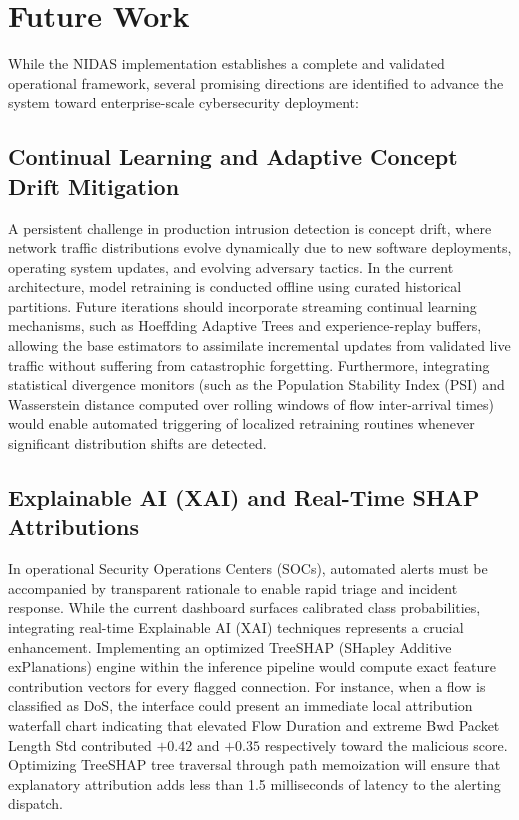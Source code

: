 \documentclass[12pt,a4paper]{report}
\begin{document}

\newpage
\chapter{Future Work}

While the NIDAS implementation establishes a complete and validated operational framework, several promising directions are identified to advance the system toward enterprise-scale cybersecurity deployment:

\section{Continual Learning and Adaptive Concept Drift Mitigation}

A persistent challenge in production intrusion detection is concept drift, where network traffic distributions evolve dynamically due to new software deployments, operating system updates, and evolving adversary tactics. In the current architecture, model retraining is conducted offline using curated historical partitions. Future iterations should incorporate streaming continual learning mechanisms, such as Hoeffding Adaptive Trees and experience-replay buffers, allowing the base estimators to assimilate incremental updates from validated live traffic without suffering from catastrophic forgetting. Furthermore, integrating statistical divergence monitors (such as the Population Stability Index (PSI) and Wasserstein distance computed over rolling windows of flow inter-arrival times) would enable automated triggering of localized retraining routines whenever significant distribution shifts are detected.

\section{Explainable AI (XAI) and Real-Time SHAP Attributions}

In operational Security Operations Centers (SOCs), automated alerts must be accompanied by transparent rationale to enable rapid triage and incident response. While the current dashboard surfaces calibrated class probabilities, integrating real-time Explainable AI (XAI) techniques represents a crucial enhancement. Implementing an optimized TreeSHAP (SHapley Additive exPlanations) engine within the inference pipeline would compute exact feature contribution vectors for every flagged connection. For instance, when a flow is classified as DoS, the interface could present an immediate local attribution waterfall chart indicating that elevated Flow Duration and extreme Bwd Packet Length Std contributed $+0.42$ and $+0.35$ respectively toward the malicious score. Optimizing TreeSHAP tree traversal through path memoization will ensure that explanatory attribution adds less than 1.5 milliseconds of latency to the alerting dispatch.
\end{document}
